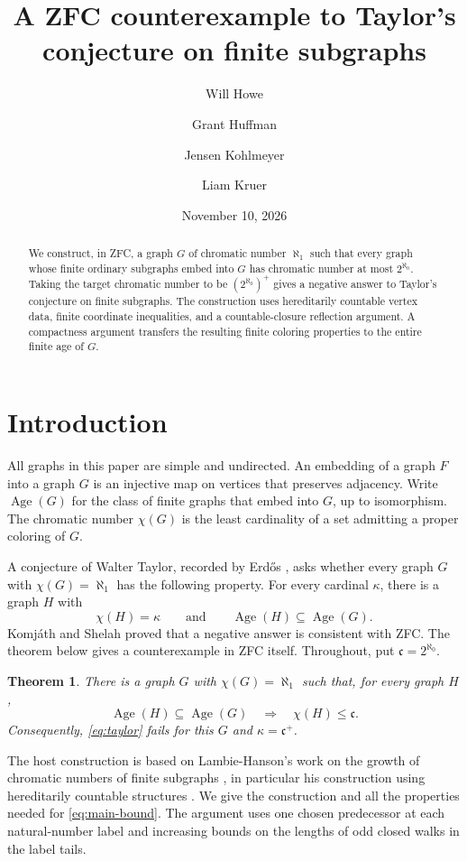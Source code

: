 \documentclass[11pt,leqno]{amsart}
\title[Taylor's conjecture on finite subgraphs]{A ZFC counterexample to Taylor's conjecture on finite subgraphs}
\author[W. Howe]{Will Howe}
\author[G. Huffman]{Grant Huffman}
\author[J. Kohlmeyer]{Jensen Kohlmeyer}
\author[L. Kruer]{Liam Kruer}
\date{November 10, 2026}
\newtheorem{theorem}{Theorem}[section]
\theoremstyle{definition}
\numberwithin{equation}{section}
\newcommand{\cc}{\mathfrak c}
\newcommand{\Age}{\operatorname{Age}}
\newcommand{\sub}{\subseteq}
\begin{document}
\begin{abstract}
We construct, in ZFC, a graph $G$ of chromatic number $\aleph_1$ such that every graph whose finite ordinary subgraphs embed into $G$ has chromatic number at most $2^{\aleph_0}$. Taking the target chromatic number to be $(2^{\aleph_0})^+$ gives a negative answer to Taylor's conjecture on finite subgraphs. The construction uses hereditarily countable vertex data, finite coordinate inequalities, and a countable-closure reflection argument. A compactness argument transfers the resulting finite coloring properties to the entire finite age of $G$.
\end{abstract}
\maketitle

\section{Introduction}
All graphs in this paper are simple and undirected. An embedding of a graph $F$ into a graph $G$ is an injective map on vertices that preserves adjacency. Write $\Age(G)$ for the class of finite graphs that embed into $G$, up to isomorphism. The chromatic number $\chi(G)$ is the least cardinality of a set admitting a proper coloring of $G$.

A conjecture of Walter Taylor, recorded by Erd\H{o}s \cite{erdos}, asks whether every graph $G$ with $\chi(G)=\aleph_1$ has the following property. For every cardinal $\kappa$, there is a graph $H$ with
\begin{equation}\label{eq:taylor}
\chi(H)=\kappa
\qquad\text{and}\qquad
\Age(H)\sub\Age(G).
\end{equation}
Komj\'ath and Shelah \cite{komjath-shelah} proved that a negative answer is consistent with ZFC. The theorem below gives a counterexample in ZFC itself. Throughout, put $\cc=2^{\aleph_0}$.

\begin{theorem}\label{thm:main}
There is a graph $G$ with $\chi(G)=\aleph_1$ such that, for every graph $H$,
\begin{equation}\label{eq:main-bound}
\Age(H)\sub\Age(G)\quad\Longrightarrow\quad\chi(H)\le\cc.
\end{equation}
Consequently, \eqref{eq:taylor} fails for this $G$ and $\kappa=\cc^+$.
\end{theorem}

The host construction is based on Lambie-Hanson's work on the growth of chromatic numbers of finite subgraphs \cite{lh-paper}, in particular his construction using hereditarily countable structures \cite{lh-talk}. We give the construction and all the properties needed for \eqref{eq:main-bound}. The argument uses one chosen predecessor at each natural-number label and increasing bounds on the lengths of odd closed walks in the label tails.
\end{document}
